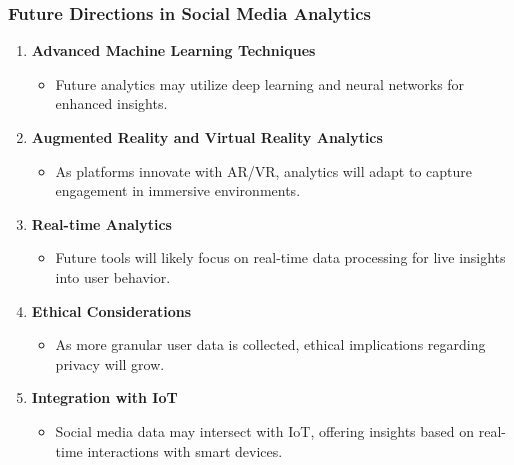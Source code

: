 \documentclass{beamer}
\begin{document}
\begin{frame}[fragile]
    \frametitle{Future Directions in Social Media Analytics}
    
    \begin{enumerate}
        \item \textbf{Advanced Machine Learning Techniques}
        \begin{itemize}
            \item Future analytics may utilize deep learning and neural networks for enhanced insights.
        \end{itemize}
        
        \item \textbf{Augmented Reality and Virtual Reality Analytics}
        \begin{itemize}
            \item As platforms innovate with AR/VR, analytics will adapt to capture engagement in immersive environments.
        \end{itemize}
        
        \item \textbf{Real-time Analytics}
        \begin{itemize}
            \item Future tools will likely focus on real-time data processing for live insights into user behavior.
        \end{itemize}
        
        \item \textbf{Ethical Considerations}
        \begin{itemize}
            \item As more granular user data is collected, ethical implications regarding privacy will grow.
        \end{itemize}
        
        \item \textbf{Integration with IoT}
        \begin{itemize}
            \item Social media data may intersect with IoT, offering insights based on real-time interactions with smart devices.
        \end{itemize}
    \end{enumerate}
\end{frame}
\end{document}
